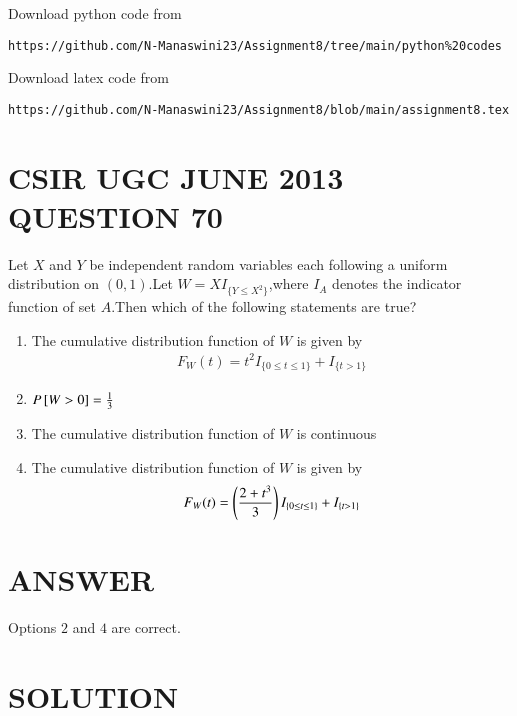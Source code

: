 \documentclass[journal,12pt,twocolumn]{IEEEtran}
\begin{document}
\renewcommand{\thefigure}{\theenumi}
\renewcommand{\thetable}{\theenumi}
Download python code from 
\begin{lstlisting}
https://github.com/N-Manaswini23/Assignment8/tree/main/python%20codes
\end{lstlisting}
%
Download latex code from 
\begin{lstlisting}
https://github.com/N-Manaswini23/Assignment8/blob/main/assignment8.tex
\end{lstlisting}
%

\section*{CSIR UGC JUNE 2013 QUESTION 70}
Let $X$ and $Y$ be independent random variables each following a uniform distribution on $(0,1)$.Let $W=XI_{\{Y\leq X^2\}}$,where $I_A$ denotes the indicator function of set $A$.Then which of the following statements are true? \\
\begin{enumerate}
\item The cumulative distribution function of $W$ is given by
\begin{align}
  F_W(t)=t^2I_{\{0\leq t \leq 1\}}+ I_{\{t > 1\}}
\end{align}
\item $P{}\left[W>0\right]=\frac{1}{3}$
\item The cumulative distribution function of $W$ is continuous
\item The cumulative distribution function of $W$ is given by
\begin{align}
  F_W(t)=\left(\frac{2+t^3}{3}\right)I_{\{0\leq t \leq 1\}}+ I_{\{t > 1\}}
\end{align}
\end{enumerate}

\section*{ANSWER}
Options $2$ and $4$ are correct.

\section*{SOLUTION}
\end{document}
